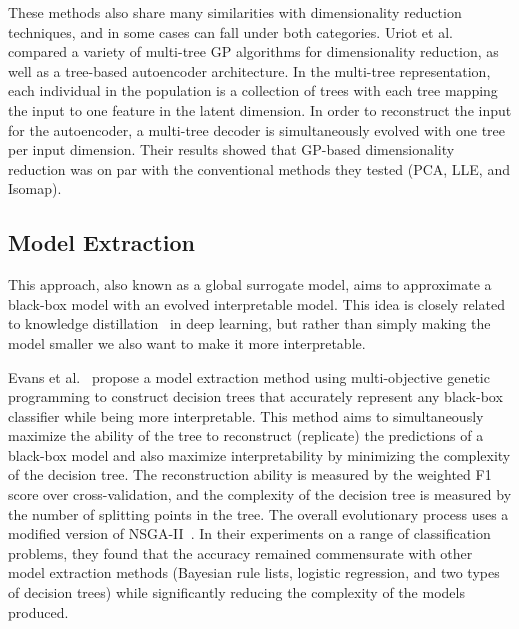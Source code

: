 \documentclass[graybox]{svmult}
\begin{document}
These methods also share many similarities with dimensionality reduction techniques, and in some cases can fall under both categories. Uriot et al.~\cite{uriotGeneticProgrammingRepresentations2022} compared a variety of multi-tree GP algorithms for dimensionality reduction, as well as a tree-based autoencoder architecture. In the multi-tree representation, each individual in the population is a collection of trees with each tree mapping the input to one feature in the latent dimension. In order to reconstruct the input for the autoencoder, a multi-tree decoder is simultaneously evolved with one tree per input dimension. Their results showed that GP-based dimensionality reduction was on par with the conventional methods they tested (PCA, LLE, and Isomap).


\subsection{Model Extraction}

This approach, also known as a global surrogate model, aims to approximate a black-box model with an evolved interpretable model. This idea is closely related to knowledge distillation~\cite{buciluaModelCompression2006,hintonDistillingKnowledgeNeural2015} in deep learning, but rather than simply making the model smaller we also want to make it more interpretable.

Evans et al.~\cite{iMLGP_Evans_GECCO_19} propose a model extraction method using multi-objective genetic programming to construct decision trees that accurately represent any black-box classifier while being more interpretable. This method aims to simultaneously maximize the ability of the tree to reconstruct (replicate) the predictions of a black-box model and also maximize interpretability by minimizing the complexity of the decision tree. The reconstruction ability is measured by the weighted F1 score over cross-validation, and the complexity of the decision tree is measured by the number of splitting points in the tree. The overall evolutionary process uses a modified version of NSGA-II~\cite{NSGA-II_Deb_TEC_02}. In their experiments on a range of classification problems, they found that the accuracy remained commensurate with other model extraction methods (Bayesian rule lists, logistic regression, and two types of decision trees) while significantly reducing the complexity of the models produced.

\end{document}
